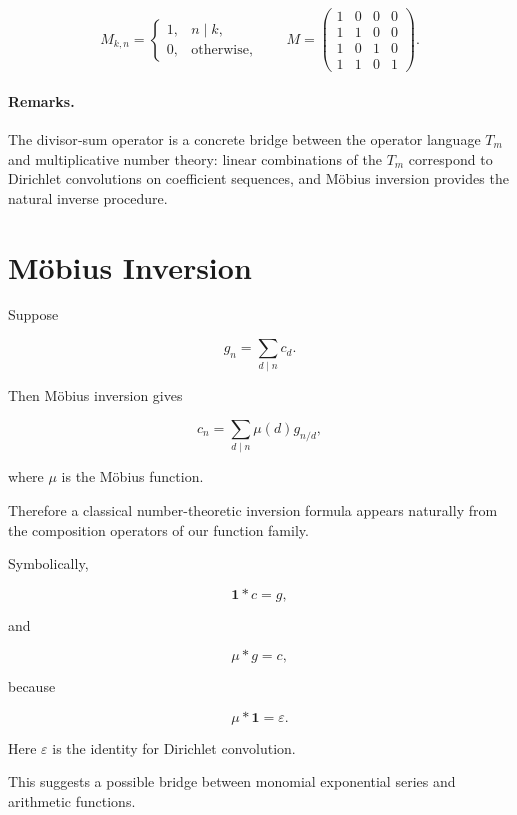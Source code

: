 \[
M_{k,n}=\begin{cases}1,& n\mid k,\\0,&\text{otherwise,}\end{cases}
\qquad
M=\begin{pmatrix}
1 & 0 & 0 & 0\\
1 & 1 & 0 & 0\\
1 & 0 & 1 & 0\\
1 & 1 & 0 & 1
\end{pmatrix}.
\]



\paragraph{Remarks.}
The divisor‑sum operator is a concrete bridge between the operator
language \(T_m\) and multiplicative number theory: linear combinations
of the \(T_m\) correspond to Dirichlet convolutions on coefficient
sequences, and Möbius inversion provides the natural inverse procedure.


\section{Möbius Inversion}

Suppose

\[
g_n
=
\sum_{d\mid n}c_d.
\]

Then Möbius inversion gives

\[
\boxed{
c_n
=
\sum_{d\mid n}
\mu(d)
g_{n/d},
}
\]

where \(\mu\) is the Möbius function.

Therefore a classical number-theoretic inversion formula appears
naturally from the composition operators of our function family.

Symbolically,

\[
\mathbf{1}*c=g,
\]

and

\[
\mu*g=c,
\]

because

\[
\mu*\mathbf{1}=\varepsilon.
\]

Here \(\varepsilon\) is the identity for Dirichlet convolution.

This suggests a possible bridge between monomial exponential series
and arithmetic functions.

